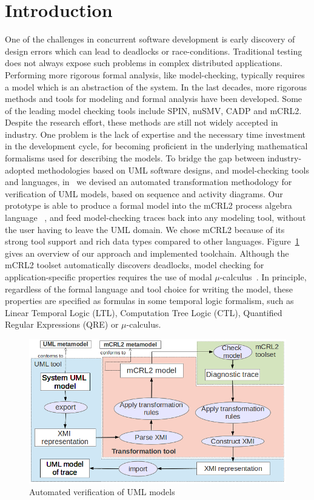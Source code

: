 \documentclass[letter]{llncs}
\newcommand{\figshrink}{\vspace{-.6cm}}
\newcommand{\figshrinkend}{}
\begin{document}
\section{Introduction}
\label{sec:Introduction}
One of the challenges in concurrent software development is early discovery of design errors which can lead to deadlocks or race-conditions.
Traditional testing does not always expose such problems in complex distributed applications. Performing more rigorous formal analysis, like model-checking, 
typically requires a model which is an abstraction of the system.
In the last decades, more rigorous methods and tools
for modeling and formal analysis have been developed. Some of the leading model checking tools include SPIN, nuSMV, CADP and mCRL2. 
Despite the research effort, these methods are still not widely accepted in industry. One problem is the lack of expertise and
the necessary time investment in the development cycle, for becoming proficient in
the underlying mathematical formalisms used for describing the models. 
To bridge the gap between industry-adopted methodologies based on UML software
designs, and model-checking tools and languages, in~\cite{DBLP:dblp_conf/nfm/RemenskaTWHVCB13} we devised 
an automated transformation methodology for verification of UML
models, based on sequence and activity diagrams. Our prototype is able to produce
a formal model into the mCRL2 process algebra language ~\cite{FormalLanguagemCRL2}, and feed model-checking traces back into any modeling
tool, without the user having to leave the UML domain. We chose mCRL2 because of its strong tool support and rich data types compared to other languages.
Figure~\ref{fig:approach} gives an overview of our approach and implemented toolchain.
Although the mCRL2 toolset automatically discovers deadlocks, model checking
for application-specific properties requires the use of modal $\mu$-calculus~\cite{Groote05model-checkingprocesses}. In principle, regardless of the formal language and tool choice for writing the model, these properties 
are specified as formulas in some temporal logic formalism, such as Linear Temporal Logic (LTL), Computation Tree Logic (CTL), Quantified Regular Expressions (QRE) or $\mu$-calculus.
\begin{figure}[!t]
\centering
\figshrink
\includegraphics[width=0.7\linewidth,keepaspectratio=true]{./Approach.png}
\caption{Automated verification of UML models}
\label{fig:approach}
\figshrinkend
\end{figure}
\end{document}
